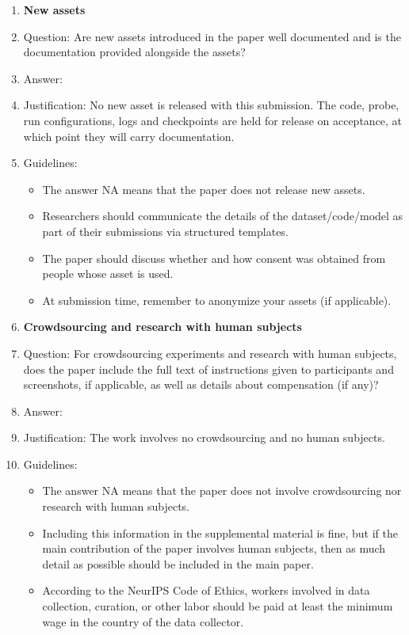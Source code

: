 \begin{enumerate}
\item {\bf New assets}
    \item[] Question: Are new assets introduced in the paper well documented and is the documentation provided alongside the assets?
    \item[] Answer: \answerNA{}
    \item[] Justification: No new asset is released with this submission. The code, probe, run configurations, logs and checkpoints are held for release on acceptance, at which point they will carry documentation.
    \item[] Guidelines:
    \begin{itemize}
        \item The answer NA means that the paper does not release new assets.
        \item Researchers should communicate the details of the dataset/code/model as part of their submissions via structured templates.
        \item The paper should discuss whether and how consent was obtained from people whose asset is used.
        \item At submission time, remember to anonymize your assets (if applicable).
    \end{itemize}

\item {\bf Crowdsourcing and research with human subjects}
    \item[] Question: For crowdsourcing experiments and research with human subjects, does the paper include the full text of instructions given to participants and screenshots, if applicable, as well as details about compensation (if any)?
    \item[] Answer: \answerNA{}
    \item[] Justification: The work involves no crowdsourcing and no human subjects.
    \item[] Guidelines:
    \begin{itemize}
        \item The answer NA means that the paper does not involve crowdsourcing nor research with human subjects.
        \item Including this information in the supplemental material is fine, but if the main contribution of the paper involves human subjects, then as much detail as possible should be included in the main paper.
        \item According to the NeurIPS Code of Ethics, workers involved in data collection, curation, or other labor should be paid at least the minimum wage in the country of the data collector.
    \end{itemize}


\end{enumerate}
